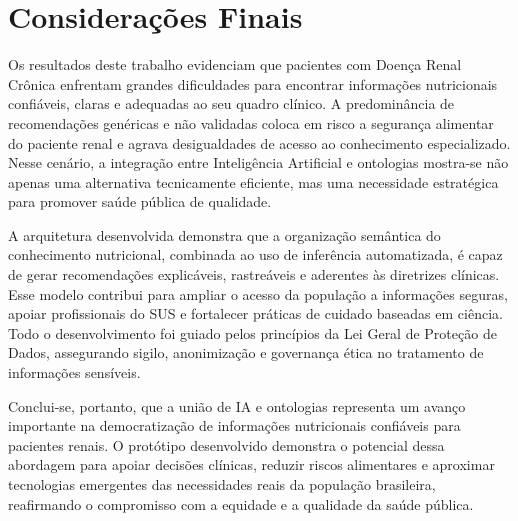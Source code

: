 \documentclass[12pt, a4paper, twocolumn]{article}
\begin{document}
\section{Considerações Finais}

Os resultados deste trabalho evidenciam que pacientes com Doença Renal Crônica enfrentam grandes dificuldades para encontrar informações nutricionais confiáveis, claras e adequadas ao seu quadro clínico. A predominância de recomendações genéricas e não validadas coloca em risco a segurança alimentar do paciente renal e agrava desigualdades de acesso ao conhecimento especializado. Nesse cenário, a integração entre Inteligência Artificial e ontologias mostra-se não apenas uma alternativa tecnicamente eficiente, mas uma necessidade estratégica para promover saúde pública de qualidade.

A arquitetura desenvolvida demonstra que a organização semântica do conhecimento nutricional, combinada ao uso de inferência automatizada, é capaz de gerar recomendações explicáveis, rastreáveis e aderentes às diretrizes clínicas. Esse modelo contribui para ampliar o acesso da população a informações seguras, apoiar profissionais do SUS e fortalecer práticas de cuidado baseadas em ciência. Todo o desenvolvimento foi guiado pelos princípios da Lei Geral de Proteção de Dados, assegurando sigilo, anonimização e governança ética no tratamento de informações sensíveis.

Conclui-se, portanto, que a união de IA e ontologias representa um avanço importante na democratização de informações nutricionais confiáveis para pacientes renais. O protótipo desenvolvido demonstra o potencial dessa abordagem para apoiar decisões clínicas, reduzir riscos alimentares e aproximar tecnologias emergentes das necessidades reais da população brasileira, reafirmando o compromisso com a equidade e a qualidade da saúde pública.
\end{document}
